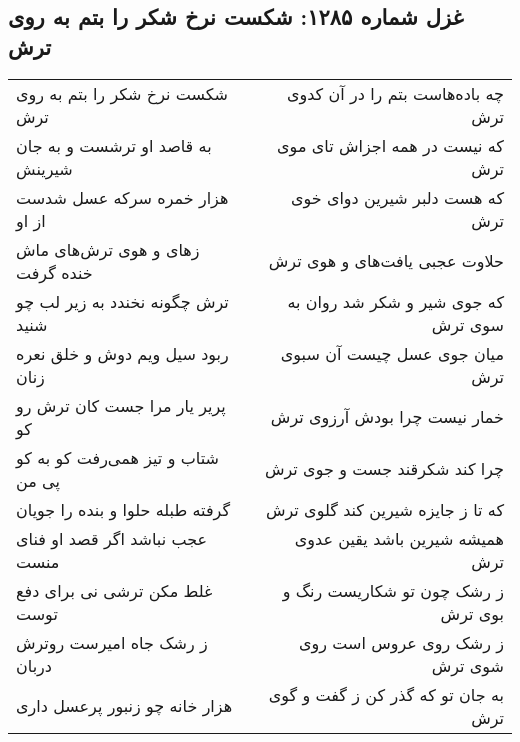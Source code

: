 \begin{center}
\section*{غزل شماره ۱۲۸۵: شکست نرخ شکر را بتم به روی ترش}
\label{sec:1285}
\begin{longtable}{l p{0.5cm} r}
شکست نرخ شکر را بتم به روی ترش
&&
چه باده‌هاست بتم را در آن کدوی ترش
\\
به قاصد او ترشست و به جان شیرینش
&&
که نیست در همه اجزاش تای موی ترش
\\
هزار خمره سرکه عسل شدست از او
&&
که هست دلبر شیرین دوای خوی ترش
\\
زهای و هوی ترش‌های ماش خنده گرفت
&&
حلاوت عجبی یافت‌های و هوی ترش
\\
ترش چگونه نخندد به زیر لب چو شنید
&&
که جوی شیر و شکر شد روان به سوی ترش
\\
ربود سیل ویم دوش و خلق نعره زنان
&&
میان جوی عسل چیست آن سبوی ترش
\\
پریر یار مرا جست کان ترش رو کو
&&
خمار نیست چرا بودش آرزوی ترش
\\
شتاب و تیز همی‌رفت کو به کو پی من
&&
چرا کند شکرقند جست و جوی ترش
\\
گرفته طبله حلوا و بنده را جویان
&&
که تا ز جایزه شیرین کند گلوی ترش
\\
عجب نباشد اگر قصد او فنای منست
&&
همیشه شیرین باشد یقین عدوی ترش
\\
غلط مکن ترشی نی برای دفع توست
&&
ز رشک چون تو شکاریست رنگ و بوی ترش
\\
ز رشک جاه امیرست روترش دربان
&&
ز رشک روی عروس است روی شوی ترش
\\
هزار خانه چو زنبور پرعسل داری
&&
به جان تو که گذر کن ز گفت و گوی ترش
\\
\end{longtable}
\end{center}
